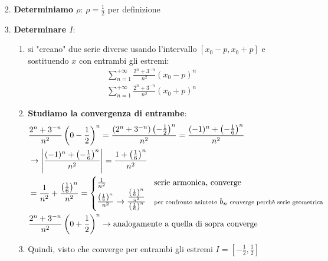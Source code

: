\documentclass[10pt, a4paper]{article}
\begin{document}
\begin{enumerate}
\begin{enumerate}
\begin{enumerate}
\begin{equation*}
                    \end{equation*}
                    \item \textbf{Determiniamo $\rho$}: $\rho=\frac{1}{2}$ per definizione
                    \item \textbf{Determinare $I$}: \begin{enumerate}
                        \item si "creano" due serie diverse usando l'intervallo $\left[x_0-p,x_0+p\right]$ e sostituendo $x$ con entrambi gli estremi: \begin{equation*}
                            \begin{split}
                                &\sum_{n=1}^{+\infty}\frac{2^n+3^{-n}}{n^2}\left(x_0-p\right)^n\\
                                &\sum_{n=1}^{+\infty}\frac{2^n+3^{-n}}{n^2}\left(x_0+p\right)^n
                            \end{split}
                        \end{equation*}
                        \item \textbf{Studiamo la convergenza di entrambe}: \begin{equation*}
                            \begin{split}
                                &\frac{2^n+3^{-n}}{n^2}\left(0-\frac{1}{2}\right)^n=\frac{\left(2^n+3^{-n}\right)\left(-\frac{1}{2}\right)^n}{n^2}=\frac{(-1)^n+\left(-\frac{1}{6}\right)^n}{n^2}\\
                                &\rightarrow\left|\frac{(-1)^n+\left(-\frac{1}{6}\right)^n}{n^2}\right|=\frac{1+\left(\frac{1}{6}\right)^n}{n^2}\\
                                &=\frac{1}{n^2}+\frac{\left(\frac{1}{6}\right)^n}{n^2}=\begin{cases}
                                    \frac{1}{n^2} & \text{serie armonica, converge}\\
                                    \frac{\left(\frac{1}{6}\right)^n}{n^2}\rightarrow \frac{\frac{\left(\frac{1}{6}\right)^n}{n^2}}{\left(\frac{1}{6}\right)^n} & \scriptsize\text{per confronto asintoto } b_n \text{ converge perchè serie geometrica}\normalsize
                                \end{cases}\\
                                &\frac{2^n+3^{-n}}{n^2}\left(0+\frac{1}{2}\right)^n \rightarrow \text{analogamente a quella di sopra converge}
                            \end{split}                            
                        \end{equation*}
                        \item Quindi, visto che converge per entrambi gli estremi $I=\left[-\frac{1}{2},\frac{1}{2}\right]$
                    \end{enumerate}
                \end{enumerate}
            \end{enumerate}
        \end{enumerate}
\end{document}

